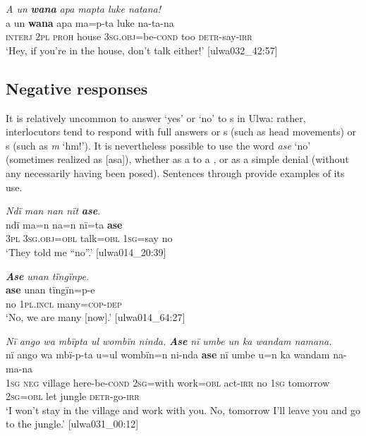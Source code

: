 \ea%
    \label{ex:syntax:175}
          \textit{A un} \textbf{\textit{wana}} \textit{apa mapta luke natana!}\\
\gll    a    un  \textbf{wana}  apa    ma=p-ta      luke  na-ta-na\\
    \textsc{interj}  \textsc{2pl}  \textsc{proh}  house  3\textsc{sg.obj}=be\textsc{{}-cond} too    \textsc{detr-}say-\textsc{irr}\\
\glt `Hey, if you’re in the house, don’t talk either!’ [ulwa032\_42:57]
\z

\subsection{Negative responses}\label{sec:13.3.5}


It is relatively uncommon to answer ‘yes’ or ‘no’ to s in Ulwa: rather, interlocutors tend to respond with full answers or s (such as head movements) or s (such as \textit{m} ‘hm!’). It is nevertheless possible to use the word \textit{ase} ‘no’ (sometimes realized as [asa]), whether as a  to a , or as a simple denial (without any  necessarily having been posed). Sentences  through  provide examples of its use.

\ea%
    \label{ex:syntax:176}
          \textit{Ndï man nan nït} \textbf{\textit{ase}}.\\
\gll ndï  ma=n      na=n    nï=ta    \textbf{ase}\\
    3\textsc{pl}  3\textsc{sg.obj=obl}  talk=\textsc{obl}  \textsc{1sg=}say  no\\
\glt `They told me “no”.’ [ulwa014\_20:39]
\z

\ea%
    \label{ex:syntax:177}
          \textbf{\textit{Ase}} \textit{unan tïngïnpe.}\\
\gll    \textbf{ase}  unan    tïngïn=p-e\\
    no  1\textsc{pl.incl}  many=\textsc{cop{}-dep}\\
\glt `No, we are many [now].’ [ulwa014\_64:27]
\z

\ea%
    \label{ex:syntax:178}
          \textit{Nï ango wa mbïpta ul wombïn ninda.} \textbf{\textit{Ase}} \textit{nï umbe un ka wandam namana.}\\
\gll nï    ango  wa    mbï-p-ta    u=ul    wombïn=n  ni-nda     \textbf{ase}  nï    umbe    u=n    ka  wandam  na-ma-na\\
    1\textsc{sg}  \textsc{neg}  village  here-be\textsc{{}-cond}  \textsc{2sg=}with  work=\textsc{obl}  act-\textsc{irr}    no  1\textsc{sg}  tomorrow  2\textsc{sg=obl}  let  jungle    \textsc{detr-}go-\textsc{irr}\\
\glt `I won’t stay in the village and work with you. No, tomorrow I’ll leave you and go to the jungle.’ [ulwa031\_00:12]
\z

